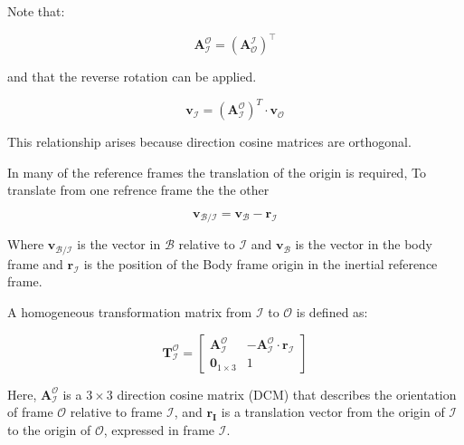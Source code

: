 \noindent Note that:

\begin{equation}
    \mathbf{A}_\mathcal{I}^\mathcal{O} = \left( \mathbf{A}_\mathcal{O}^\mathcal{I} \right)^\top
\end{equation}

\noindent and that the reverse rotation can be applied.

\begin{equation}
    \mathbf{v}_\mathcal{I} = \left(\mathbf{A}_\mathcal{I}^\mathcal{O}\right)^T \cdot \mathbf{v}_\mathcal{O}
\end{equation}

\noindent This relationship arises because direction cosine matrices are orthogonal.


In many of the reference frames the translation of the origin is required, To translate from one refrence frame the the other

\begin{equation}
    \mathbf{v}_\mathcal{B/I} = \mathbf{v}_\mathcal{B} - \mathbf{r}_\mathcal{I}
\end{equation}

\noindent Where $\mathbf{v}_\mathcal{B/I}$ is the vector in $\mathcal{B}$ relative to $\mathcal{I}$ and $\mathbf{v}_\mathcal{B}$ is the vector in 
the body frame and $\mathbf{r}_\mathcal{I}$ is the position of the Body frame origin in the inertial reference frame.


\noindent A homogeneous transformation matrix from $\mathcal{I}$ to $\mathcal{O}$ is defined as:

\begin{equation}
    \mathbf{T}_\mathcal{I}^\mathcal{O} =
    \begin{bmatrix}
        \mathbf{A}_\mathcal{I}^\mathcal{O} & -\mathbf{A}_\mathcal{I}^\mathcal{O} \cdot \mathbf{r}_\mathcal{I} \\
        \mathbf{0}_{1 \times 3} & 1
    \end{bmatrix}
\end{equation}

\noindent Here, $\mathbf{A}_\mathcal{I}^\mathcal{O}$ is a $3 \times 3$ direction cosine matrix (DCM) that describes the orientation of frame $\mathcal{O}$ 
relative to frame $\mathcal{I}$, and $\mathbf{r_I}$ is a translation vector from the origin of $\mathcal{I}$ to the origin of $\mathcal{O}$, expressed 
in frame $\mathcal{I}$.

